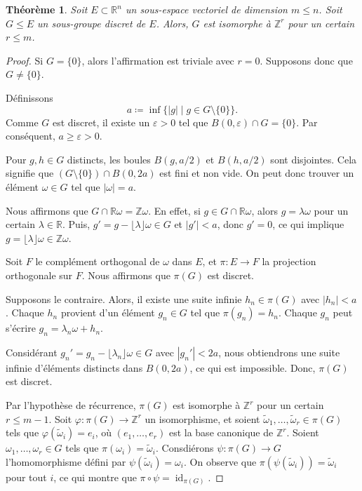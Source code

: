 \documentclass{article}
\newcommand{\R}{\mathbb{R}}
\newcommand{\Z}{\mathbb{Z}}
\newtheorem*{thm}{Théorème}
\begin{document}
\begin{thm}
Soit \( E \subset \R^n \) un sous-espace vectoriel de dimension \( m \leq n \). Soit \( G \leq E \) un sous-groupe discret de \( E \). Alors, \( G \) est isomorphe à \( \Z^r \) pour un certain \( r \leq m \).
\end{thm}

\begin{proof}
Si \( G = \{0\} \), alors l'affirmation est triviale avec \( r = 0 \). Supposons donc que \( G \neq \{0\} \).

Définissons
\[
a \coloneq \inf \{ |g| \mid g \in G \setminus \{0\} \}.
\]
Comme \( G \) est discret, il existe un \(\varepsilon > 0\) tel que \( B(0, \varepsilon) \cap G = \{0\} \). Par conséquent, \( a \geq \varepsilon > 0 \).

Pour \( g, h \in G \) distincts, les boules \( B(g, a/2) \) et \( B(h, a/2) \) sont disjointes. Cela signifie que \( (G \setminus \{0\}) \cap B(0, 2a) \) est fini et non vide. On peut donc trouver un élément \( \omega \in G \) tel que \( |\omega| = a \).

Nous affirmons que \( G \cap \R \omega = \Z \omega \). En effet, si \( g \in G \cap \R \omega \), alors \( g = \lambda \omega \) pour un certain \( \lambda \in \R \). Puis, \( g' = g - \lfloor \lambda \rfloor \omega \in G \) et \( |g'| < a \), donc \( g' = 0 \), ce qui implique \( g = \lfloor \lambda \rfloor \omega \in \Z \omega \).

Soit \( F \) le complément orthogonal de \( \omega \) dans \( E \), et \( \pi \colon E \to F \) la projection orthogonale sur \( F \). Nous affirmons que \( \pi(G) \) est discret.

Supposons le contraire. Alors, il existe une suite infinie \( h_n \in \pi(G) \) avec \( |h_n| < a \). Chaque \( h_n \) provient d'un élément \( g_n \in G \) tel que \( \pi(g_n) = h_n \). Chaque \( g_n \) peut s'écrire \( g_n = \lambda_n \omega + h_n \).

Considérant \( g_n' = g_n - \lfloor \lambda_n \rfloor \omega \in G \) avec \( |g_n'| < 2a \), nous obtiendrons une suite infinie d'éléments distincts dans \( B(0, 2a) \), ce qui est impossible. Donc, \( \pi(G) \) est discret.

Par l'hypothèse de récurrence, \( \pi(G) \) est isomorphe à \( \Z^r \) pour un certain \( r \leq m - 1 \). Soit \( \varphi \colon \pi(G) \to \Z^r \) un isomorphisme, et soient \( \tilde \omega_1, \ldots, \tilde \omega_r \in \pi(G) \) tels que \( \varphi(\tilde \omega_i) = e_i \), où \( (e_1, \ldots, e_r) \) est la base canonique de \( \Z^r \). Soient \( \omega_1, \ldots, \omega_r \in G \) tels que \( \pi(\omega_i) = \tilde \omega_i \). Consdiérons $\psi \colon \pi(G) \to G$ l'homomorphisme défini par $\psi(\tilde \omega_i) = \omega_i$. On observe que $\pi(\psi(\tilde \omega_i)) = \tilde \omega_i$ pour tout $i$, ce qui montre que $\pi \circ \psi = \operatorname{id}_{\pi(G)}$.


\end{proof}
\end{document}
